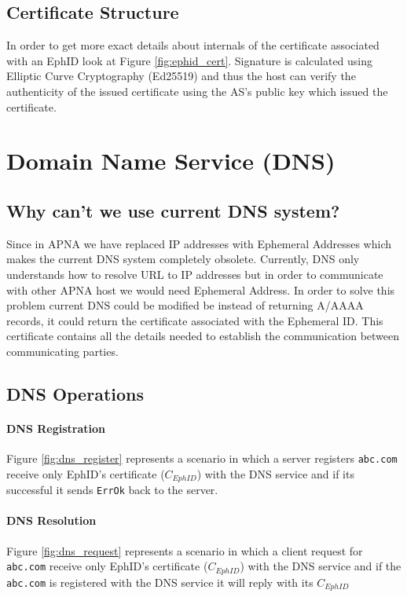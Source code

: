 \subsection{Certificate Structure}
In order to get more exact details about internals of the certificate associated with an EphID look at Figure \ref{fig:ephid_cert}. Signature is calculated using Elliptic Curve Cryptography (Ed25519) and thus the host can verify the authenticity of the issued certificate using the AS's public key which issued the certificate.

\section{Domain Name Service (DNS)} \label{sec:apna_dns}
\subsection{Why can't we use current DNS system?}
Since in APNA we have replaced IP addresses with Ephemeral Addresses which makes the current DNS system completely obsolete. Currently, DNS only understands how to resolve URL to IP addresses but in order to communicate with other APNA host we would need Ephemeral Address. In order to solve this problem current DNS could be modified be instead of returning A/AAAA records, it could return the certificate associated with the Ephemeral ID. This certificate contains all the details needed to establish the communication between communicating parties.

\subsection{DNS Operations}
\paragraph{DNS Registration}
Figure \ref{fig:dns_register} represents a scenario in which a server registers \texttt{abc.com} receive only EphID's certificate ($C_{EphID}$) with the DNS service and if its successful it sends \texttt{ErrOk} back to the server.

\paragraph{DNS Resolution}
Figure \ref{fig:dns_request} represents a scenario in which a client request for \texttt{abc.com} receive only EphID's certificate ($C_{EphID}$) with the DNS service and if the \texttt{abc.com} is registered with the DNS service it will reply with its $C_{EphID}$

